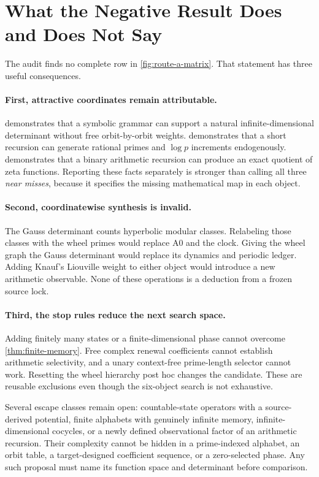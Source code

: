 \section{What the Negative Result Does and Does Not Say}
\label{sec:scope}

The audit finds no complete row in \cref{fig:route-a-matrix}.  That statement
has three useful consequences.

\paragraph{First, attractive coordinates remain attributable.}
 demonstrates that a symbolic grammar can support a natural
infinite-dimensional determinant without free orbit-by-orbit weights.
 demonstrates that a short recursion can generate rational
primes and \(\log p\) increments endogenously.   demonstrates
that a binary arithmetic recursion can produce an exact quotient of zeta
functions.  Reporting these facts separately is stronger than calling all
three \emph{near misses}, because it specifies the missing mathematical map in
each object.

\paragraph{Second, coordinatewise synthesis is invalid.}
The Gauss determinant counts hyperbolic modular classes.  Relabeling those
classes with the wheel primes would replace A0 and the clock.  Giving the
wheel graph the Gauss determinant would replace its dynamics and periodic
ledger.  Adding Knauf's Liouville weight to either object would introduce a
new arithmetic observable.  None of these operations is a deduction from a
frozen source lock.

\paragraph{Third, the stop rules reduce the next search space.}
Adding finitely many states or a finite-dimensional phase cannot overcome
\cref{thm:finite-memory}.  Free complex renewal coefficients cannot establish
arithmetic selectivity, and a unary context-free prime-length selector cannot
work.  Resetting the wheel hierarchy post hoc changes the candidate.  These
are reusable exclusions even though the six-object search is not exhaustive.

Several escape classes remain open: countable-state operators with a
source-derived potential, finite alphabets with genuinely infinite memory,
infinite-dimensional cocycles, or a newly defined observational factor of an
arithmetic recursion.  Their complexity cannot be hidden in a prime-indexed
alphabet, an orbit table, a target-designed coefficient sequence, or a
zero-selected phase.  Any such proposal must name its function space and
determinant before comparison.

